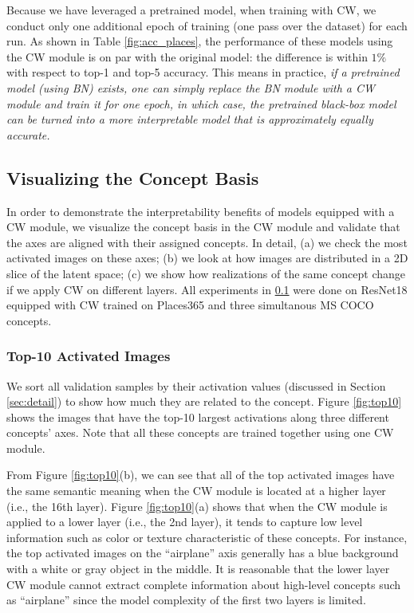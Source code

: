 \documentclass{article}
\begin{document}
Because we have leveraged a pretrained model, when training with CW, we conduct only one additional epoch of training (one pass over the dataset) for each run. 
As shown in Table \ref{fig:acc_places}, the performance of these models using the CW module is on par with the original model: the difference is within $1\%$ with respect to top-1 and top-5 accuracy. This means in practice, \textit{if a pretrained model (using BN) exists, one can simply replace the BN module with a CW module and train it for one epoch, in which case, the pretrained black-box model can be turned into a more interpretable model that is approximately equally accurate.}


\subsection{Visualizing the Concept Basis} \label{sec:visualize_basis}
In order to demonstrate the interpretability benefits of models equipped with a CW module, we visualize the concept basis in the CW module and validate that the axes are aligned with their assigned concepts. In detail, (a) we check the most activated images on these axes; (b) we look at how images are distributed in a 2D slice of the latent space; (c) we show how realizations of the same concept change if we apply CW on different layers. All experiments in \ref{sec:visualize_basis} were done on ResNet18 equipped with CW trained on Places365 and three simultanous MS COCO concepts.

\subsubsection{Top-10 Activated Images}
\label{sec:top10}
We sort all validation samples by their activation values (discussed in Section \ref{sec:detail}) to show how much they are related to the concept. 
Figure \ref{fig:top10} shows the images that have the top-10 largest activations along three different concepts' axes. Note that all these concepts are trained together using one CW module. 

From Figure \ref{fig:top10}(b), we can see that all of the top activated images have the same semantic meaning when the CW module is located at a higher layer (i.e., the 16th layer). Figure \ref{fig:top10}(a) shows that when the CW module is applied to a lower layer (i.e., the 2nd layer), it tends to capture low level information such as color or texture characteristic of these concepts. For instance, the top activated images on the ``airplane'' axis generally has a blue background with a white or gray object in the middle. It is reasonable that the lower layer CW module cannot extract complete information about high-level concepts such as ``airplane'' since the model complexity of the first two layers is limited.
\end{document}
